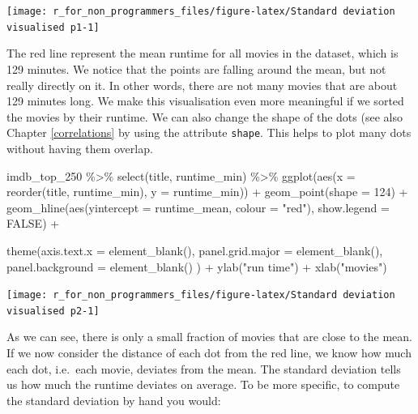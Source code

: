 \documentclass[
]{book}
\newenvironment{Shaded}{\begin{snugshade}}{\end{snugshade}}
\newcommand{\AttributeTok}[1]{\textcolor[rgb]{0.77,0.63,0.00}{#1}}
\newcommand{\ConstantTok}[1]{\textcolor[rgb]{0.00,0.00,0.00}{#1}}
\newcommand{\DecValTok}[1]{\textcolor[rgb]{0.00,0.00,0.81}{#1}}
\newcommand{\FunctionTok}[1]{\textcolor[rgb]{0.00,0.00,0.00}{#1}}
\newcommand{\NormalTok}[1]{#1}
\newcommand{\SpecialCharTok}[1]{\textcolor[rgb]{0.00,0.00,0.00}{#1}}
\newcommand{\StringTok}[1]{\textcolor[rgb]{0.31,0.60,0.02}{#1}}
\begin{document}
\begin{center}\texttt{[image: r\_for\_non\_programmers\_files/figure-latex/Standard deviation visualised p1-1]} \end{center}

The red line represent the mean runtime for all movies in the dataset, which is 129 minutes. We notice that the points are falling around the mean, but not really directly on it. In other words, there are not many movies that are about 129 minutes long. We make this visualisation even more meaningful if we sorted the movies by their runtime. We can also change the shape of the dots (see also Chapter \ref{correlations} by using the attribute \texttt{shape}. This helps to plot many dots without having them overlap.

\begin{Shaded}
\begin{Highlighting}[]
\NormalTok{imdb\_top\_250 }\SpecialCharTok{\%\textgreater{}\%} 
  \FunctionTok{select}\NormalTok{(title, runtime\_min) }\SpecialCharTok{\%\textgreater{}\%} 
  \FunctionTok{ggplot}\NormalTok{(}\FunctionTok{aes}\NormalTok{(}\AttributeTok{x =} \FunctionTok{reorder}\NormalTok{(title, runtime\_min), }\AttributeTok{y =}\NormalTok{ runtime\_min)) }\SpecialCharTok{+}
  \FunctionTok{geom\_point}\NormalTok{(}\AttributeTok{shape =} \DecValTok{124}\NormalTok{) }\SpecialCharTok{+}
  \FunctionTok{geom\_hline}\NormalTok{(}\FunctionTok{aes}\NormalTok{(}\AttributeTok{yintercept =}\NormalTok{ runtime\_mean, }\AttributeTok{colour =} \StringTok{"red"}\NormalTok{), }\AttributeTok{show.legend =} \ConstantTok{FALSE}\NormalTok{) }\SpecialCharTok{+}
  
  \FunctionTok{theme}\NormalTok{(}\AttributeTok{axis.text.x =} \FunctionTok{element\_blank}\NormalTok{(),    }
        \AttributeTok{panel.grid.major =} \FunctionTok{element\_blank}\NormalTok{(),}
        \AttributeTok{panel.background =} \FunctionTok{element\_blank}\NormalTok{()}
\NormalTok{        ) }\SpecialCharTok{+}
  \FunctionTok{ylab}\NormalTok{(}\StringTok{"run time"}\NormalTok{) }\SpecialCharTok{+}
  \FunctionTok{xlab}\NormalTok{(}\StringTok{"movies"}\NormalTok{)}
\end{Highlighting}
\end{Shaded}

\begin{center}\texttt{[image: r\_for\_non\_programmers\_files/figure-latex/Standard deviation visualised p2-1]} \end{center}

As we can see, there is only a small fraction of movies that are close to the mean. If we now consider the distance of each dot from the red line, we know how much each dot, i.e.~each movie, deviates from the mean. The standard deviation tells us how much the runtime deviates on average. To be more specific, to compute the standard deviation by hand you would:
\end{document}
